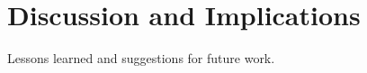 \section{Discussion and Implications}
\label{sec:discussion}

Lessons learned and suggestions for future work.